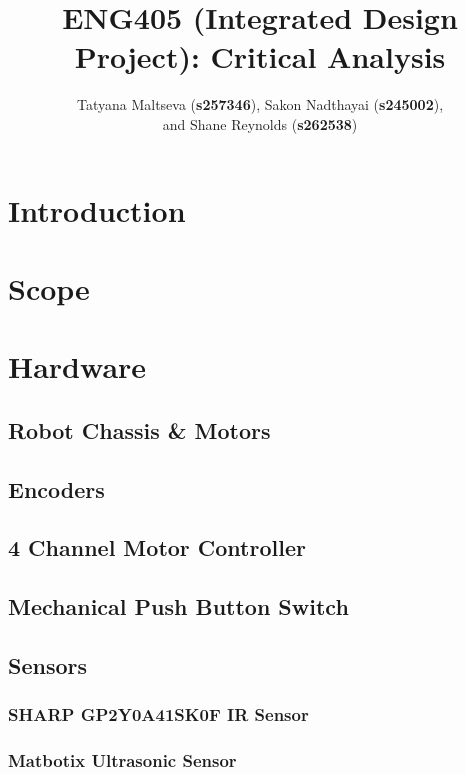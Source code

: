 \documentclass[a4paper]{article}
\begin{document}
\title{ENG405 (Integrated Design Project): Critical Analysis}
\author{Tatyana Maltseva (\textbf{s257346}), Sakon Nadthayai (\textbf{s245002}),\\ and Shane Reynolds (\textbf{s262538})}
\maketitle

\tableofcontents

\newpage

\section{Introduction}

\section{Scope}

\section{Hardware}
\subsection{Robot Chassis \& Motors}
\subsection{Encoders}
\subsection{4 Channel Motor Controller}
\subsection{Mechanical Push Button Switch}
\subsection{Sensors}
\subsubsection{SHARP GP2Y0A41SK0F IR Sensor}
\subsubsection{Matbotix Ultrasonic Sensor}
\end{document}
